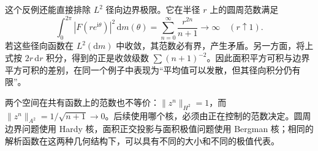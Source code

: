 这个反例还能直接排除 \(L^2\) 径向边界极限。它在半径 \(r\) 上的圆周范数满足
\[
 \int_0^{2\pi}|F(re^{\mathrm{i}\theta})|^2\,\mathrm{d}m(\theta)
 =\sum_{n=0}^{\infty}\frac{r^{2n}}{n+1}\longrightarrow\infty
 \quad(r\uparrow1).
\]
若这些径向函数在 \(L^2(\mathrm{d}m)\) 中收敛，其范数必有界，产生矛盾。另一方面，将上式按 \(2r\,\mathrm{d}r\) 积分，得到的正是收敛级数 \(\sum(n+1)^{-2}\)。因此面积平方可积与边界平方可积的差别，在同一个例子中表现为“平均值可以发散，但其径向积分仍有限”。

\ProseParagraphBreak

两个空间在共有函数上的范数也不等价：\(\|z^n\|_{H^2}=1\)，而 \(\|z^n\|_{A^2}=1/\sqrt{n+1}\to0\)。后续使用哪个核，必须由正在控制的范数决定。圆周边界问题使用 Hardy 核，面积正交投影与面积极值问题使用 Bergman 核；相同的解析函数在这两种几何结构下，可以具有不同的大小和不同的极值代表。
